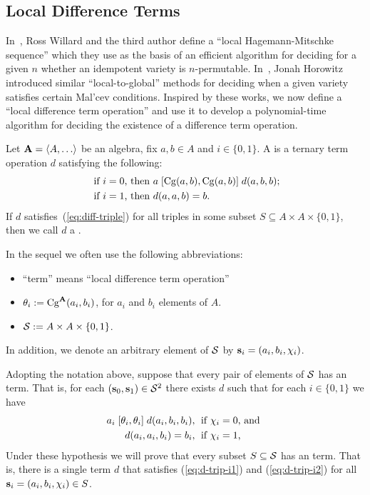 \subsection{Local Difference Terms}
\label{sec:local-diff-terms}
In~\cite{MR3239624},
Ross Willard and the third author define %
a ``local Hagemann-Mitschke sequence'' which they use as the basis of
an efficient algorithm for deciding for a given $n$ whether an idempotent
variety is $n$-permutable.
In~\cite{MR3109457}, Jonah Horowitz introduced similar 
``local-to-global'' methods for deciding when a given variety satisfies 
certain Mal'cev conditions.
Inspired by these works, we now define a ``local difference term 
operation'' and use it to develop a polynomial-time algorithm for deciding
the existence of a difference term operation.

Let $\bA=\< A, \dots\>$ be an algebra, fix $a, b \in A$ and
$i \in \{0,1\}$.
A  
is a ternary term operation $d$ satisfying the following:
\begin{align}
\text{ if $i=0$, then } & a \mathrel{[\operatorname{Cg}(a,b), \operatorname{Cg}(a,b)]} d(a,b,b); \label{eq:diff-triple}\\
\text{ if $i=1$, then } &d(a,a,b) = b. \nonumber
\end{align}
If $d$ satisfies~(\ref{eq:diff-triple}) for all triples
in some subset $S\subseteq A \times A \times \{0,1\}$, then we call $d$
a .

\smallskip

 In the sequel we often use the following 
abbreviations:
\begin{itemize}
\item 
``\ld term'' means ``local difference term operation''
\item $\theta_i:= \operatorname{Cg}^{\mathbf{A}}(a_i, b_i)$,
for $a_i$ and $b_i$ elements of $A$.
\item $\mathcal{S} := A \times A \times \{0,1\}$. 
\end{itemize}
In addition, we denote an 
arbitrary element of $\mathcal{S}$ by $\mathbf{s}_i = (a_i, b_i, \chi_i)$.

Adopting the notation above, suppose that every pair
of elements of $\mathcal{S}$ has an \ld term.
That is, for each $(\mathbf{s}_0, \mathbf{s}_1)\in \mathcal{S}^2$ there exists
$d$ such that for each $i \in \{0,1\}$ we have
\begin{align}
  a_i \comr{\theta_i} d(a_i,b_i,b_i), & \;
  \text{ if $\chi_i=0$, and }  \label{eq:d-trip-i1}\\
  d(a_i,a_i,b_i) =b_i, & \;
  \text{ if $\chi_i=1$,}\label{eq:d-trip-i2} %
\end{align}
Under these hypothesis we will prove that every subset $S\subseteq \mathcal{S}$
has an \ld term.
That is, there is a single term $d$ that satisfies
(\ref{eq:d-trip-i1}) and (\ref{eq:d-trip-i2}) for all 
$\mathbf{s}_i = (a_i, b_i, \chi_i) \in S$.

